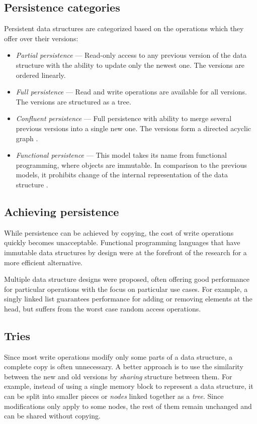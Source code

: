 \subsection{Persistence categories}
Persistent data structures are categorized based on the operations which they offer over their versions:
\begin{itemize}
    \item \textit{Partial persistence} --- Read-only access to any previous version of the data structure with the ability to update only the newest one. The versions are ordered linearly.
    \item \textit{Full persistence} --- Read and write operations are available for all versions. The versions are structured as a tree.
    \item \textit{Confluent persistence} --- Full persistence with ability to merge several previous versions into a single new one. The versions form a directed acyclic graph \cite{fully-persistent-lists-with-catenation}.
    \item \textit{Functional persistence} --- This model takes its name from functional programming, where objects are immutable. In comparison to the previous models, it prohibits change of the internal representation of the data structure \cite{purely-functional-data-structures}.
\end{itemize}

\subsection{Achieving persistence}
While persistence can be achieved by copying, the cost of write operations quickly becomes unacceptable. Functional programming languages that have immutable data structures by design were at the forefront of the research for a more efficient alternative.

Multiple data structure designs were proposed, often offering good performance for particular operations with the focus on particular use cases. For example, a singly linked list guarantees  performance for adding or removing elements at the head, but suffers from the worst case  random access operations.

\subsection{Tries}
Since most write operations modify only some parts of a data structure, a complete copy is often unnecessary. A better approach is to use the similarity between the new and old versions by \emph{sharing} structure between them. For example, instead of using a single memory block to represent a data structure, it can be split into smaller pieces or \emph{nodes} linked together as a \emph{tree}. Since modifications only apply to some nodes, the rest of them remain unchanged and can be shared without copying.

